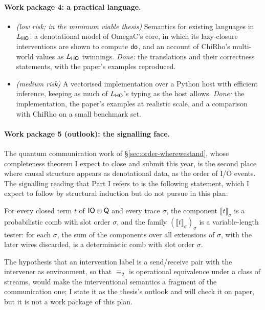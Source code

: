 \paragraph{Work package 4: a practical language.}
\begin{itemize}[nosep]
\item[4a] \textit{(low risk; in the minimum viable thesis)} Semantics for existing languages in $L_{\mathsf{HO}}$: a denotational model of OmegaC's core, in which its lazy-closure interventions are shown to compute $\mathsf{do}$, and an account of ChiRho's multi-world values as $L_{\mathsf{HO}}$ twinnings. \emph{Done:} the translations and their correctness statements, with the paper's examples reproduced.
\item[4b] \textit{(medium risk)} A vectorised implementation over a Python host with efficient inference, keeping as much of $L_{\mathsf{HO}}$'s typing as the host allows. \emph{Done:} the implementation, the paper's examples at realistic scale, and a comparison with ChiRho on a small benchmark set. 
\end{itemize}

\paragraph{Work package 5 (outlook): the signalling face.} The quantum communication work of \S\ref{sec:order-wherewestand}, whose completeness theorem I expect to close and submit this year, is the second place where causal structure appears as denotational data, as the order of I/O events. The signalling reading that Part I refers to is the following statement, which I expect to follow by structural induction but do not pursue in this plan:
\begin{conj}\label{conj:b1}
For every closed term $t$ of $\mathsf{IO}\otimes\mathsf{Q}$ and every trace $\sigma$, the component $\llbracket t\rrbracket_\sigma$ is a probabilistic comb with slot order $\sigma$, and the family $(\llbracket t\rrbracket_\sigma)_\sigma$ is a variable-length tester: for each $\sigma$, the sum of the components over all extensions of $\sigma$, with the later wires discarded, is a deterministic comb with slot order $\sigma$.
\end{conj}
\noindent The hypothesis that an intervention label is a send/receive pair with the intervener as environment, so that $\equiv_2$ is operational equivalence under a class of streams, would make the interventional semantics a fragment of the communication one; I state it as the thesis's outlook and will check it on paper, but it is not a work package of this plan.

